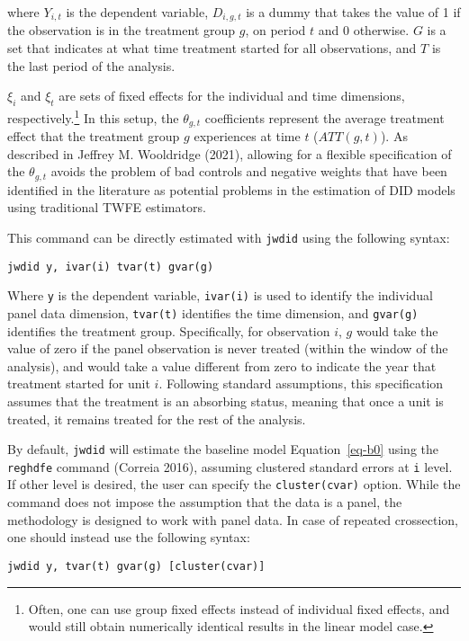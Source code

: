 \documentclass[
  letterpaper,
  DIV=11,
  numbers=noendperiod]{scrartcl}
\begin{document}
where \(Y_{i,t}\) is the dependent variable, \(D_{i,g,t}\) is a dummy
that takes the value of 1 if the observation is in the treatment group
\(g\), on period \(t\) and 0 otherwise. \(G\) is a set that indicates at
what time treatment started for all observations, and \(T\) is the last
period of the analysis.

\(\xi_i\) and \(\xi_t\) are sets of fixed effects for the individual and
time dimensions, respectively.\footnote{Often, one can use group fixed
  effects instead of individual fixed effects, and would still obtain
  numerically identical results in the linear model case.} In this
setup, the \(\theta_{g,t}\) coefficients represent the average treatment
effect that the treatment group \(g\) experiences at time \(t\)
(\(ATT(g,t)\)). As described in Jeffrey M. Wooldridge (2021), allowing
for a flexible specification of the \(\theta_{g,t}\) avoids the problem
of bad controls and negative weights that have been identified in the
literature as potential problems in the estimation of DID models using
traditional TWFE estimators.

This command can be directly estimated with \texttt{jwdid} using the
following syntax:

\texttt{jwdid\ y,\ ivar(i)\ tvar(t)\ gvar(g)}

Where \texttt{y} is the dependent variable, \texttt{ivar(i)} is used to
identify the individual panel data dimension, \texttt{tvar(t)}
identifies the time dimension, and \texttt{gvar(g)} identifies the
treatment group. Specifically, for observation \(i\), \(g\) would take
the value of zero if the panel observation is never treated (within the
window of the analysis), and would take a value different from zero to
indicate the year that treatment started for unit \(i\). Following
standard assumptions, this specification assumes that the treatment is
an absorbing status, meaning that once a unit is treated, it remains
treated for the rest of the analysis.

By default, \texttt{jwdid} will estimate the baseline model
Equation~\ref{eq-b0} using the \texttt{reghdfe} command (Correia 2016),
assuming clustered standard errors at \texttt{i} level. If other level
is desired, the user can specify the \texttt{cluster(cvar)} option.
While the command does not impose the assumption that the data is a
panel, the methodology is designed to work with panel data. In case of
repeated crossection, one should instead use the following syntax:

\texttt{jwdid\ y,\ tvar(t)\ gvar(g)\ {[}cluster(cvar){]}}
\end{document}
